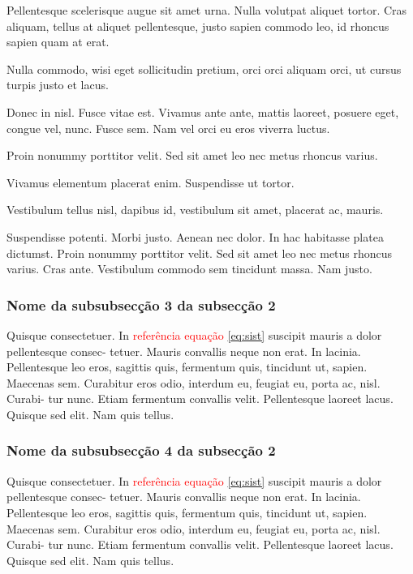 Pellentesque scelerisque augue sit amet urna. Nulla volutpat aliquet tortor. Cras aliquam, tellus at aliquet pellentesque, justo sapien commodo leo, id rhoncus sapien quam at erat.

Nulla commodo, wisi eget sollicitudin pretium, orci orci aliquam orci, ut cursus turpis justo et lacus.

Donec in nisl. Fusce vitae est. Vivamus ante ante, mattis laoreet, posuere eget, congue vel, nunc. Fusce sem. Nam vel orci eu eros viverra luctus.

Proin nonummy porttitor velit. Sed sit amet leo nec metus rhoncus varius.

Vivamus elementum placerat enim. Suspendisse ut tortor.

Vestibulum tellus nisl, dapibus id, vestibulum sit amet, placerat ac, mauris.

Suspendisse potenti. Morbi justo. Aenean nec dolor. In hac habitasse platea dictumst. Proin nonummy porttitor velit. Sed sit amet leo nec metus rhoncus varius. Cras ante. Vestibulum commodo sem tincidunt massa. Nam justo.

\subsubsection{Nome da subsubsecção 3 da subsecção 2}
Quisque consectetuer. In \textcolor{red}{referência equação} \ref{eq:sist} suscipit mauris a dolor pellentesque consec- tetuer. Mauris convallis neque non erat. In lacinia. Pellentesque leo eros, sagittis quis, fermentum quis, tincidunt ut, sapien. Maecenas sem. Curabitur eros odio, interdum eu, feugiat eu, porta ac, nisl. Curabi- tur nunc. Etiam fermentum convallis velit. Pellentesque laoreet lacus. Quisque sed elit. Nam quis tellus.

\subsubsection{Nome da subsubsecção 4 da subsecção 2}
Quisque consectetuer. In \textcolor{red}{referência equação} \ref{eq:sist} suscipit mauris a dolor pellentesque consec- tetuer. Mauris convallis neque non erat. In lacinia. Pellentesque leo eros, sagittis quis, fermentum quis, tincidunt ut, sapien. Maecenas sem. Curabitur eros odio, interdum eu, feugiat eu, porta ac, nisl. Curabi- tur nunc. Etiam fermentum convallis velit. Pellentesque laoreet lacus. Quisque sed elit. Nam quis tellus.

